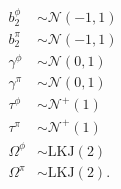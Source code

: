 \documentclass{beamer}
\begin{document}
\begin{frame}
\begin{center}
\begin{scriptsize}
\begin{columns}
\begin{column}{0.5\textwidth}
\begin{align*}
            b^{\phi}_{2} &\sim \mathcal{N}(-1, 1) \\
            b^{\pi}_{2} &\sim \mathcal{N}(-1, 1) \\
            \gamma^{\phi} &\sim \mathcal{N}(0, 1) \\
            \gamma^{\pi} &\sim \mathcal{N}(0, 1) \\
            \tau^{\phi} &\sim \mathcal{N}^{+}(1) \\
            \tau^{\pi} &\sim \mathcal{N}^{+}(1) \\
            \Omega^{\phi} &\sim \text{LKJ}(2) \\
            \Omega^{\pi} &\sim \text{LKJ}(2). \\
          \end{align*}
        \end{column}
      \end{columns}
    \end{scriptsize} 
  \end{center}
\end{frame}



%
%
%
\end{document}
